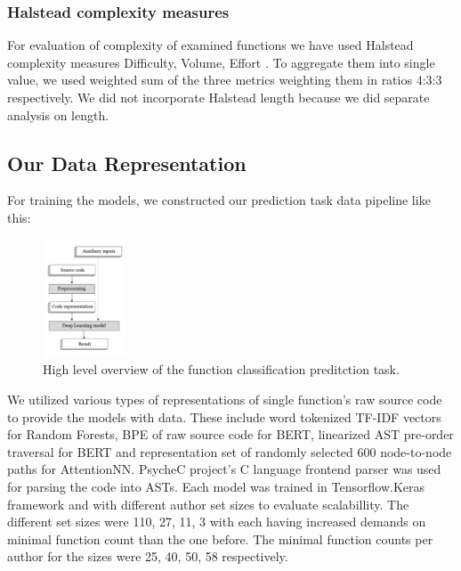 \documentclass{article}
\begin{document}
\subsubsection{Halstead complexity measures}

For evaluation of complexity of examined functions we have used Halstead complexity 
measures Difficulty, Volume, Effort \cite{halstead}. To aggregate them into single value, 
we used weighted sum of the three metrics weighting them in ratios 4:3:3 respectively. 
We did not incorporate Halstead length because we did separate analysis on length.

\subsection{Our Data Representation}
For training the models, we constructed our prediction task data pipeline like this:

\begin{figure}[H]
    \centering
    \includegraphics[width=2.5cm, height=3.5cm]{figures/high_level_prediciton_task.png}
    \caption{\cite{compiler_based} High level overview of the function classification preditction task.}
    \label{fig:predictive_task}
\end{figure}

We utilized various 
types of representations of single function's raw source code to provide the models with data.
These include word tokenized TF-IDF vectors for Random Forests, BPE of raw source code for
BERT, linearized AST pre-order traversal for BERT and representation set of randomly selected 600 node-to-node paths for AttentionNN.  
PsycheC project's C language frontend parser \cite{psychec} was used for parsing the code into ASTs. Each model was trained in Tensorflow.Keras framework and with different author set sizes to evaluate scalabillity. The different set sizes were
110, 27, 11, 3 with each having increased demands on minimal function count than the one before. The minimal function counts per author for the sizes were 25, 40, 50, 58 respectively.
\end{document}

